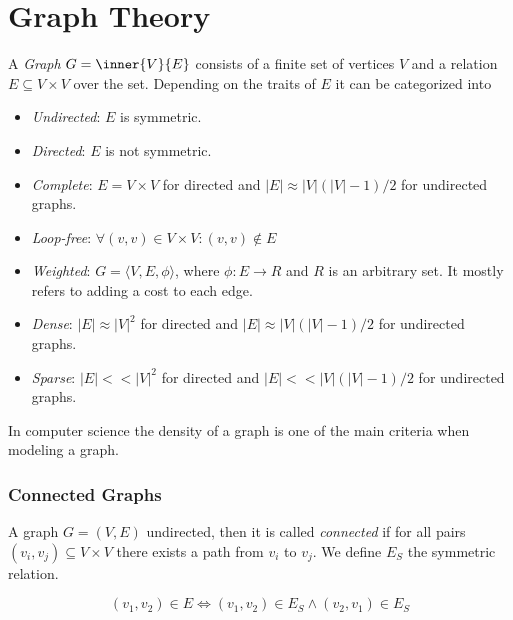 
\chapter{Graph Theory}

A \emph{Graph} \(G = \inner{V}{E} \) consists of a finite set of vertices \(V\) and a relation 
\(E \subseteq V \times V\) over the set. Depending on the traits of \(E\) it can be categorized into 

\begin{itemize}

    \item \emph{Undirected}: \(E\) is symmetric.

    \item \emph{Directed}: \(E\) is not symmetric.

    \item \emph{Complete}: \(E = V \times V\) for directed and \(|E| \approx |V| (|V| - 1) / 2\) for undirected graphs.

    \item \emph{Loop-free}: \(\forall(v,v) \in V \times V : (v,v) \notin E \)

    \item \emph{Weighted}: \(G = \langle V, E, \phi \rangle\), where \(\phi: E \to R\) and \(R\) is an arbitrary set.
    It mostly refers to adding a cost to each edge.

    \item \emph{Dense}: \(|E| \approx |V|^2\) for directed and \(|E| \approx |V| (|V| - 1) / 2\) for undirected graphs.

    \item \emph{Sparse}: \(|E| << |V|^2\) for directed and \(|E| << |V| (|V| - 1) / 2\) for undirected graphs.

\end{itemize}

In computer science the density of a graph is one of the main criteria when modeling a graph. 

\subsection{Connected Graphs}

A graph \(G = (V,E)\) undirected, then it is called \emph{connected} if for all pairs \((v_i, v_j) \subseteq V \times V\) there exists a 
path from \(v_i\) to \(v_j\). We define \(E_S\) the symmetric relation. 

\[
    (v_1, v_2) \in E \iff (v_1, v_2) \in E_S \land (v_2, v_1) \in E_S
\]

